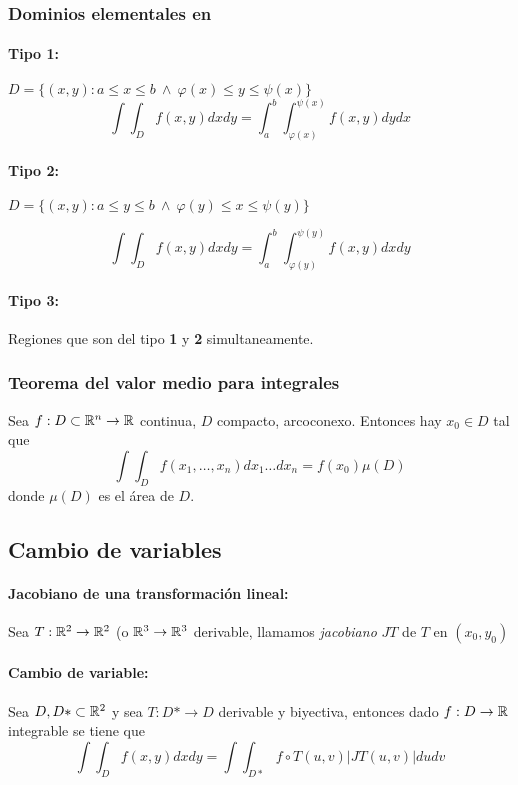 \subsubsection{Dominios elementales en \texorpdfstring{\reales}{los reales}}
\paragraph{Tipo 1:} $D = \{(x,y) : a\leq x\leq b ~\land~ \varphi(x)\leq y \leq \psi(x)\}$
$$\int\int_D f(x,y)dxdy = \int_a^b\int_{\varphi(x)}^{\psi(x)}f(x,y)dydx $$

\paragraph{Tipo 2:} $D = \{(x,y) : a\leq y\leq b ~\land~ \varphi(y)\leq x \leq \psi(y)\}$

$$\int\int_D f(x,y)dxdy = \int_a^b\int_{\varphi(y)}^{\psi(y)}f(x,y)dxdy $$

\paragraph{Tipo 3:} Regiones que son del tipo \textbf{1} y \textbf{2} simultaneamente.

\subsubsection{Teorema del valor medio para integrales}
Sea $f:D\subset\mathbb{R}^n\to\mathbb{R}$ continua, $D$ compacto, arcoconexo. Entonces hay $x_0\in D$ tal que $$\int\int_D f(x_1,\dots,x_n)dx_1\dots dx_n = f(x_0)\mu(D)$$ donde $\mu(D)$ es el área de $D$.

\subsection{Cambio de variables}
\paragraph{Jacobiano de una transformación lineal: }Sea $T:\mathbb{R}^2\to\mathbb{R}^2$ (o $\mathbb{R}^3\to\mathbb{R}^3$ derivable, llamamos \textit{jacobiano} $JT$ de $T$ en $(x_0, y_0)$

\paragraph{Cambio de variable: }
Sea $D, D*\subset\mathbb{R}^2$ y sea $T:D*\to D$ derivable y biyectiva, entonces dado $f:D\to\mathbb{R}$ integrable se tiene que
$$\int\int_D f(x,y)dxdy = \int\int_{D*} f\circ T(u,v)|JT(u,v)|dudv$$

